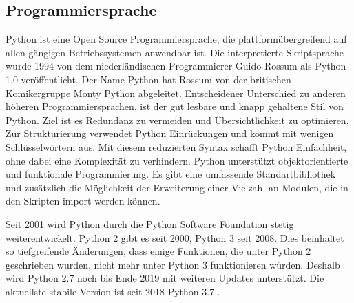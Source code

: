\subsection{Programmiersprache}
Python ist eine Open Source Programmiersprache, die plattformübergreifend auf allen gängigen Betriebssystemen anwendbar ist. Die interpretierte Skriptsprache wurde 1994 von dem niederländischen Programmierer Guido Rossum als Python 1.0 veröffentlicht. Der Name Python hat Rossum von der britischen Komikergruppe Monty Python abgeleitet.
Entscheidener Unterschied zu anderen höheren Programmiersprachen, ist der gut lesbare und knapp gehaltene Stil von Python. Ziel ist es Redundanz zu vermeiden und Übersichtlichkeit zu optimieren. Zur Strukturierung verwendet Python Einrückungen und kommt mit wenigen Schlüsselwörtern aus. Mit diesem reduzierten Syntax schafft Python Einfachheit, ohne dabei eine Komplexität zu verhindern. Python unterstützt objektorientierte und funktionale Programmierung. Es gibt eine umfassende  Standartbibliothek und zusätzlich die Möglichkeit der Erweiterung einer Vielzahl an Modulen, die in den Skripten import werden können.


Seit 2001 wird Python durch die Python Software Foundation stetig weiterentwickelt. 
Python 2 gibt es seit 2000, Python 3 seit 2008. Dies beinhaltet so tiefgreifende Änderungen, dass einige Funktionen, die unter Python 2 geschrieben wurden, nicht mehr unter Python 3 funktionieren würden. Deshalb wird Python 2.7 noch bis Ende 2019 mit weiteren Updates unterstützt. Die aktuellste stabile Version ist seit 2018 Python 3.7 \citep[vgl.][]{PSF2019}.


